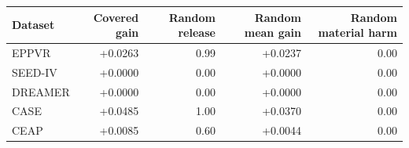\begin{tabular}{lrrrr}
\toprule
Dataset & Covered gain & Random release & Random mean gain & Random material harm \\
\midrule
EPPVR & +0.0263 & 0.99 & +0.0237 & 0.00 \\
SEED-IV & +0.0000 & 0.00 & +0.0000 & 0.00 \\
DREAMER & +0.0000 & 0.00 & +0.0000 & 0.00 \\
CASE & +0.0485 & 1.00 & +0.0370 & 0.00 \\
CEAP & +0.0085 & 0.60 & +0.0044 & 0.00 \\
\bottomrule
\end{tabular}

